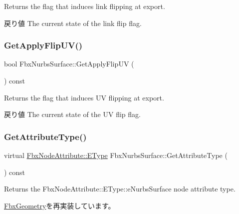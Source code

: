 Returns the flag that induces link flipping at export. \begin{DoxyReturn}{戻り値}
The current state of the link flip flag. 
\end{DoxyReturn}
\mbox{\label{class_fbx_nurbs_surface_affe176abf8148f5bdef5b66caf684211}} 
\subsubsection{\texorpdfstring{Get\+Apply\+Flip\+U\+V()}{GetApplyFlipUV()}}
{\footnotesize\ttfamily bool Fbx\+Nurbs\+Surface\+::\+Get\+Apply\+Flip\+UV (\begin{DoxyParamCaption}{ }\end{DoxyParamCaption}) const}

Returns the flag that induces UV flipping at export. \begin{DoxyReturn}{戻り値}
The current state of the UV flip flag. 
\end{DoxyReturn}
\mbox{\label{class_fbx_nurbs_surface_a7c075984ec95a01b9cb6031e19cbd0cf}} 
\subsubsection{\texorpdfstring{Get\+Attribute\+Type()}{GetAttributeType()}}
{\footnotesize\ttfamily virtual \hyperlink{class_fbx_node_attribute_a08e1669d3d1a696910756ab17de56d6a}{Fbx\+Node\+Attribute\+::\+E\+Type} Fbx\+Nurbs\+Surface\+::\+Get\+Attribute\+Type (\begin{DoxyParamCaption}{ }\end{DoxyParamCaption}) const\hspace{0.3cm}{\ttfamily [virtual]}}



Returns the Fbx\+Node\+Attribute\+::\+E\+Type\+::e\+Nurbs\+Surface node attribute type. 



\hyperlink{class_fbx_geometry_a41ae23e5d0cf08693bca49737f333de9}{Fbx\+Geometry}を再実装しています。

